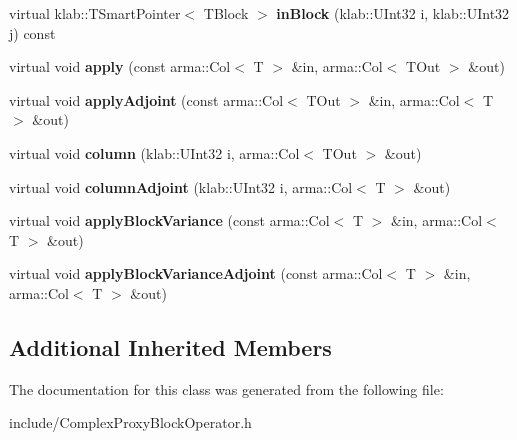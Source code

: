 \begin{DoxyCompactItemize}
\item 
virtual klab\+::\+T\+Smart\+Pointer$<$ T\+Block $>$ {\bfseries in\+Block} (klab\+::\+U\+Int32 i, klab\+::\+U\+Int32 j) const \hypertarget{classkl1p_1_1TComplexProxyBlockOperator_a2dae96932b43eef1b1fb8d9ad8a0a8bc}{}\label{classkl1p_1_1TComplexProxyBlockOperator_a2dae96932b43eef1b1fb8d9ad8a0a8bc}

\item 
virtual void {\bfseries apply} (const arma\+::\+Col$<$ T $>$ \&in, arma\+::\+Col$<$ T\+Out $>$ \&out)\hypertarget{classkl1p_1_1TComplexProxyBlockOperator_ae3c5e82f7193aabe13b924be60d97542}{}\label{classkl1p_1_1TComplexProxyBlockOperator_ae3c5e82f7193aabe13b924be60d97542}

\item 
virtual void {\bfseries apply\+Adjoint} (const arma\+::\+Col$<$ T\+Out $>$ \&in, arma\+::\+Col$<$ T $>$ \&out)\hypertarget{classkl1p_1_1TComplexProxyBlockOperator_ac5d7e87b9d186f6e4882141b7034e67f}{}\label{classkl1p_1_1TComplexProxyBlockOperator_ac5d7e87b9d186f6e4882141b7034e67f}

\item 
virtual void {\bfseries column} (klab\+::\+U\+Int32 i, arma\+::\+Col$<$ T\+Out $>$ \&out)\hypertarget{classkl1p_1_1TComplexProxyBlockOperator_a2594ccc5286444bed8eef8134a2cdfef}{}\label{classkl1p_1_1TComplexProxyBlockOperator_a2594ccc5286444bed8eef8134a2cdfef}

\item 
virtual void {\bfseries column\+Adjoint} (klab\+::\+U\+Int32 i, arma\+::\+Col$<$ T $>$ \&out)\hypertarget{classkl1p_1_1TComplexProxyBlockOperator_a212356934fe925c87a305af69d412cec}{}\label{classkl1p_1_1TComplexProxyBlockOperator_a212356934fe925c87a305af69d412cec}

\item 
virtual void {\bfseries apply\+Block\+Variance} (const arma\+::\+Col$<$ T $>$ \&in, arma\+::\+Col$<$ T $>$ \&out)\hypertarget{classkl1p_1_1TComplexProxyBlockOperator_a5cd41d10bc8970f730f3a82a8f60c38a}{}\label{classkl1p_1_1TComplexProxyBlockOperator_a5cd41d10bc8970f730f3a82a8f60c38a}

\item 
virtual void {\bfseries apply\+Block\+Variance\+Adjoint} (const arma\+::\+Col$<$ T $>$ \&in, arma\+::\+Col$<$ T $>$ \&out)\hypertarget{classkl1p_1_1TComplexProxyBlockOperator_a3727b60f9ba0080edf366b82e93f2faf}{}\label{classkl1p_1_1TComplexProxyBlockOperator_a3727b60f9ba0080edf366b82e93f2faf}

\end{DoxyCompactItemize}
\subsection*{Additional Inherited Members}


The documentation for this class was generated from the following file\+:\begin{DoxyCompactItemize}
\item 
include/Complex\+Proxy\+Block\+Operator.\+h\end{DoxyCompactItemize}
